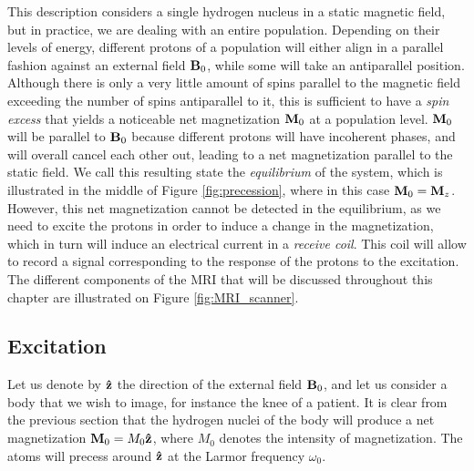 This description considers a single hydrogen nucleus in a static magnetic field, but in practice, we are dealing with an entire population. Depending on their levels of energy, different protons of a population will either align in a parallel fashion against an external field $\mathbf{B}_0$, while some will take an antiparallel position. Although there is only a very little amount of spins parallel to the magnetic field exceeding the number of spins antiparallel to it, this is sufficient to have a \textit{spin excess} that yields a noticeable net magnetization $\mathbf{M}_0$ at a population level. $\mathbf{M}_0$ will be parallel to $\mathbf{B}_0$ because different protons will have incoherent phases, and will overall cancel each other out, leading to a net magnetization parallel to the static field. We call this resulting state the \textit{equilibrium} of the system, which is illustrated in the middle of Figure \ref{fig:precession}, where in this case $\mathbf{M}_0 = \mathbf{M}_z$. However, this net magnetization cannot be detected in the equilibrium, as we need to excite the protons in order to induce a change in the magnetization, which in turn will induce an electrical current in a \textit{receive coil}. This coil will allow to record a signal corresponding to the response of the protons to the excitation. The different components of the MRI that will be discussed throughout this chapter are illustrated on Figure \ref{fig:MRI_scanner}.

\subsection{Excitation}
Let us denote by $\mathbf{\hat{z}}$ the direction of the external field $\mathbf{B}_0$, and let us consider a body that we wish to image, for instance the knee of a patient. It is clear from the previous section that the hydrogen nuclei of the body will produce a net magnetization $\mathbf{M}_0 = M_0 \mathbf{\hat{z}}$, where $M_0$ denotes the intensity of magnetization. The atoms will precess around  $\mathbf{\hat{z}}$ at the Larmor frequency $\omega_0$. 


